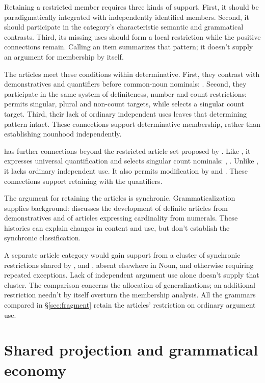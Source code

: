 \documentclass[12pt]{article}
\begin{document}
Retaining a restricted member requires three kinds of support. First, it should be paradigmatically integrated with independently identified members. Second, it should participate in the category's characteristic semantic and grammatical contrasts. Third, its missing uses should form a local restriction while the positive connections remain. Calling an item  summarizes that pattern; it doesn't supply an argument for membership by itself.

The articles meet these conditions within determinative. First, they contrast with demonstratives and quantifiers before common-noun nominals: . Second, they participate in the same system of definiteness, number and count restrictions:  permits singular, plural and non-count targets, while  selects a singular count target. Third, their lack of ordinary independent uses leaves that determining pattern intact. These connections support determinative membership, rather than establishing nounhood independently.

 has further connections beyond the restricted article set proposed by \textcite{spinillo2004reconceptualising}. Like , it expresses universal quantification and selects singular count nominals: , . Unlike , it lacks ordinary independent use. It also permits modification by  and . These connections support retaining  with the quantifiers.

The argument for retaining the articles is synchronic. Grammaticalization supplies background: \textcite[331--336]{lyons1999} discusses the development of definite articles from demonstratives and of articles expressing cardinality from numerals. These histories can explain changes in content and use, but don't establish the synchronic classification.

A separate article category would gain support from a cluster of synchronic restrictions shared by ,  and , absent elsewhere in Noun, and otherwise requiring repeated exceptions. Lack of independent argument use alone doesn't supply that cluster. The comparison concerns the allocation of generalizations; an additional restriction needn't by itself overturn the membership analysis. All the grammars compared in §\ref{sec:fragment} retain the articles' restriction on ordinary argument use.

\section{Shared projection and grammatical economy}\label{sec:economy}
\end{document}

